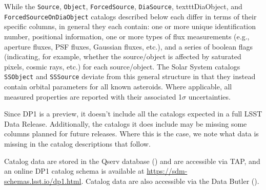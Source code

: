 While the \texttt{Source}, \texttt{Object}, \texttt{ForcedSource}, \texttt{DiaSource}, texttt{DiaObject}, and \texttt{ForcedSourceOnDiaObject} catalogs described below each differ in terms of their specific columns, in general they each contain: one or more unique identification number, positional information, one or more types of flux measurements (e.g., aperture fluxes, PSF fluxes, Gaussian fluxes, etc.), and a series of boolean flags (indicating, for example, whether the source/object is affected by saturated pixels, cosmic rays, etc.) for each source/object.
The Solar System catalogs \texttt{SSObject} and \texttt{SSSource} deviate from this general structure in that they instead contain orbital parameters for all known asteroids.
Where applicable, all measured properties are reported with their associated 1$\sigma$ uncertainties.

Since DP1 is a preview, it doesn't include all the catalogs expected in a full LSST Data Release. Additionally, the catalogs it does include may be missing some columns planned for future releases. 
Where this is the case, we note what data is missing in the catalog descriptions that follow.

Catalog data are stored in the Qserv database () and are accessible via \gls{TAP}, and an online DP1 catalog schema is available at \url{https://sdm-schemas.lsst.io/dp1.html}. 
Catalog data are also accessible via the Data Butler ().

